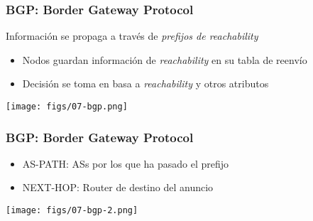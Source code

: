 \documentclass[letter]{beamer}
\begin{document}
\begin{frame}
  \frametitle{BGP: Border Gateway Protocol}

  Información se propaga a través de {\em prefijos de reachability}
  \begin{itemize}
    \item Nodos guardan información de {\em reachability} en su tabla de reenvío
    \item Decisión se toma en basa a {\em reachability} y otros atributos
  \end{itemize}
  \begin{center}
    \texttt{[image: figs/07-bgp.png]}
  \end{center}

\end{frame}
\begin{frame}
  \frametitle{BGP: Border Gateway Protocol}

  \begin{itemize}
    \item AS-PATH: ASs por los que ha pasado el prefijo
    \item NEXT-HOP: Router de destino del anuncio
  \end{itemize}

  \begin{center}
    \texttt{[image: figs/07-bgp-2.png]}
  \end{center}


\end{frame}
\end{document}
